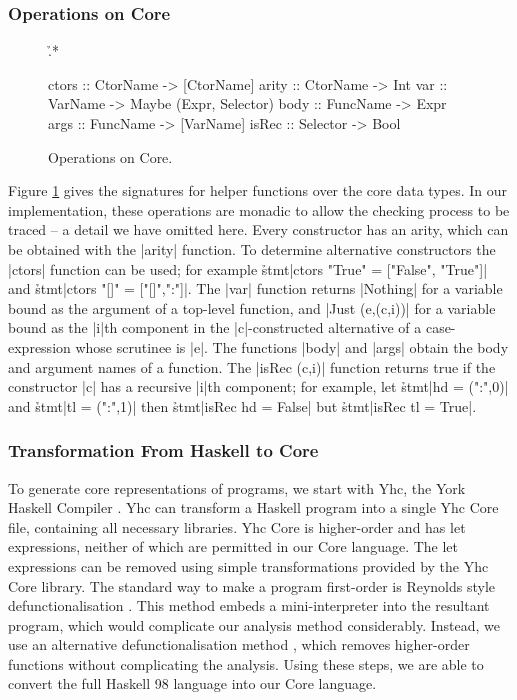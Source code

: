 \documentclass[preprint]{sigplanconf}
\begin{document}
\subsubsection{Operations on Core}

\begin{figure}
\h{.*}\begin{code}
ctors        :: CtorName  -> [CtorName]
arity        :: CtorName  -> Int
var          :: VarName   -> Maybe (Expr, Selector)
body         :: FuncName  -> Expr
args         :: FuncName  -> [VarName]
isRec        :: Selector  -> Bool
\end{code}
\caption{Operations on Core.}
\label{fig:core_operations}
\end{figure}

Figure \ref{fig:core_operations} gives the signatures for helper functions over the core data types. In our implementation, these operations are monadic to allow the checking process to be traced -- a detail we have omitted here. Every constructor has an arity, which can be obtained with the |arity| function. To determine alternative constructors the |ctors| function can be used; for example \h{stmt}|ctors "True" = ["False", "True"]| and \h{stmt}|ctors "[]" = ["[]",":"]|. The |var| function returns |Nothing| for a variable bound as the argument of a top-level function, and |Just (e,(c,i))| for a variable bound as the |i|th component in the |c|-constructed alternative of a case-expression whose scrutinee is |e|. The functions |body| and |args| obtain the body and argument names of a function. The |isRec (c,i)| function returns true if the constructor |c| has a recursive |i|th component; for example, let \h{stmt}|hd = (":",0)| and \h{stmt}|tl = (":",1)| then \h{stmt}|isRec hd = False| but \h{stmt}|isRec tl = True|.


\subsubsection{Transformation From Haskell to Core}
\label{sec:transform}

To generate core representations of programs, we start with Yhc, the York Haskell Compiler \cite{me:yhc_core}. Yhc can transform a Haskell program into a single Yhc Core file, containing all necessary libraries. Yhc Core is higher-order and has let expressions, neither of which are permitted in our Core language. The let expressions can be removed using simple transformations provided by the Yhc Core library. The standard way to make a program first-order is Reynolds style defunctionalisation \cite{reynolds:defunc}. This method embeds a mini-interpreter into the resultant program, which would complicate our analysis method considerably. Instead, we use an alternative defunctionalisation method \cite{me:firstify_hs}, which removes higher-order functions without complicating the analysis. Using these steps, we are able to convert the full Haskell 98 language into our Core language.
\end{document}
